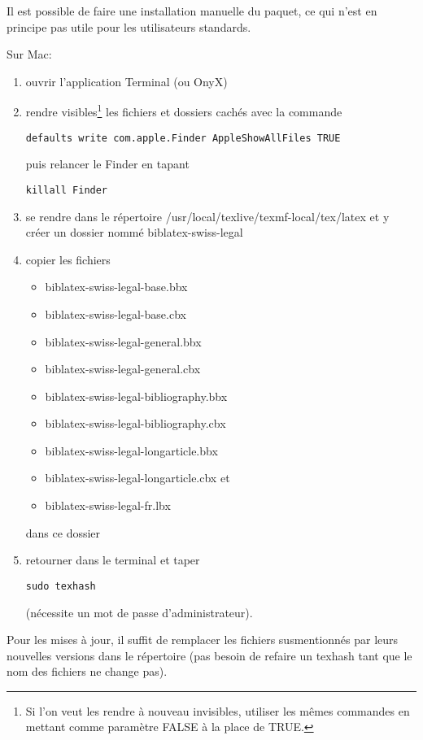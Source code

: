 \documentclass[a4paper]{ltxdockit}[2011/03/25]
\begin{document}
Il est possible de faire une installation manuelle du paquet, ce qui n'est en principe pas utile pour les utilisateurs standards. 

Sur Mac:
\begin{enumerate}
\item ouvrir l'application Terminal (ou OnyX)
\item rendre visibles\footnote{Si l'on veut les rendre à nouveau invisibles, utiliser les mêmes commandes en mettant comme paramètre FALSE à la place de TRUE.} les fichiers et dossiers cachés avec la commande
\begin{verbatim}
defaults write com.apple.Finder AppleShowAllFiles TRUE
\end{verbatim}
puis relancer le Finder en tapant
\begin{verbatim}
killall Finder
\end{verbatim}
\item se rendre dans le répertoire /usr/local/texlive/texmf-local/tex/latex et y créer un dossier nommé biblatex-swiss-legal 
\item copier les fichiers \begin{itemize}
\item biblatex-swiss-legal-base.bbx \item biblatex-swiss-legal-base.cbx \item biblatex-swiss-legal-general.bbx \item biblatex-swiss-legal-general.cbx \item biblatex-swiss-legal-bibliography.bbx \item biblatex-swiss-legal-bibliography.cbx \item biblatex-swiss-legal-longarticle.bbx \item biblatex-swiss-legal-longarticle.cbx et \item biblatex-swiss-legal-fr.lbx
\end{itemize} dans ce dossier
\item retourner dans le terminal et taper
\begin{verbatim}
sudo texhash
\end{verbatim} 
(nécessite un mot de passe d'administrateur).
\end{enumerate}

Pour les mises à jour, il suffit de remplacer les fichiers susmentionnés par leurs nouvelles versions dans le répertoire (pas besoin de refaire un texhash tant que le nom des fichiers ne change pas).
\end{document}
